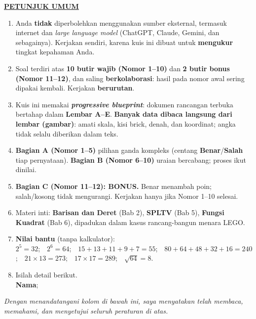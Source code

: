 \documentclass[11pt]{article}
\begin{document}
\noindent\textbf{\underline{PETUNJUK UMUM}}
\begin{enumerate}[leftmargin=*,itemsep=3pt,topsep=3pt]
  \item Anda \textbf{tidak} diperbolehkan menggunakan sumber eksternal, termasuk
        internet dan \textit{large language model} (ChatGPT, Claude, Gemini, dan
        sebagainya). Kerjakan sendiri, karena kuis ini dibuat untuk
        \textbf{mengukur} tingkat kepahaman Anda.
  \item Soal terdiri atas \textbf{10 butir wajib (Nomor 1--10)} dan \textbf{2 butir
        bonus (Nomor 11--12)}, dan saling \textbf{berkolaborasi}: hasil pada nomor
        awal sering dipakai kembali. Kerjakan \textbf{berurutan}.
  \item Kuis ini memakai \textbf{\textit{progressive blueprint}}: dokumen rancangan
        terbuka bertahap dalam \textbf{Lembar A--E}. \textbf{Banyak data dibaca
        langsung dari lembar (gambar)}: amati skala, kisi brick,
        denah, dan koordinat; angka tidak selalu diberikan dalam teks.
  \item \textbf{Bagian A (Nomor 1--5)} pilihan ganda kompleks (centang
        \textbf{Benar}/\textbf{Salah} tiap pernyataan). \textbf{Bagian B (Nomor
        6--10)} uraian bercabang; proses ikut dinilai.
  \item \textbf{Bagian C (Nomor 11--12): BONUS.} Benar menambah poin; salah/kosong
        tidak mengurangi. Kerjakan hanya jika Nomor 1--10 selesai.
  \item Materi inti: \textbf{Barisan dan Deret} (Bab 2), \textbf{SPLTV} (Bab 5),
        \textbf{Fungsi Kuadrat} (Bab 6), dipadukan dalam kasus rancang-bangun
        menara LEGO.
  \item \textbf{Nilai bantu} (tanpa kalkulator):\\[0.2em]
        \small
        $2^{5}=32$;\ \ $2^{6}=64$;\ \ $15{+}13{+}11{+}9{+}7=55$;\ \
        $80{+}64{+}48{+}32{+}16=240$;\ \ $21\times13=273$;\ \
        $17\times17=289$;\ \ $\sqrt{64}=8$.
  \item Isilah detail berikut.\\[0.3em]
        \textbf{Nama}\hspace{0.45cm};\enspace\underline{\hspace{8cm}}
\end{enumerate}

\vspace{0.3cm}
\noindent\textit{Dengan menandatangani kolom di bawah ini, saya menyatakan telah
membaca, memahami, dan menyetujui seluruh peraturan di atas.}
\end{document}
